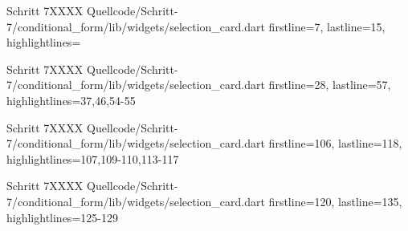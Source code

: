   \begin{alexlisting}{Schritt 7}{XXXX}
    {Quellcode/Schritt-7/conditional_form/lib/widgets/selection_card.dart}
    {firstline=7, lastline=15, highlightlines={}}
    \label{lst:Schritt6XXXX}
\end{alexlisting}
\begin{alexlisting}{Schritt 7}{XXXX}
    {Quellcode/Schritt-7/conditional_form/lib/widgets/selection_card.dart}
    {firstline=28, lastline=57, highlightlines={37,46,54-55}}
    \label{lst:Schritt6XXXX}
\end{alexlisting}
\begin{alexlisting}{Schritt 7}{XXXX}
    {Quellcode/Schritt-7/conditional_form/lib/widgets/selection_card.dart}
    {firstline=106, lastline=118, highlightlines={107,109-110,113-117}}
    \label{lst:Schritt6XXXX}
\end{alexlisting}

\begin{alexlisting}{Schritt 7}{XXXX}
    {Quellcode/Schritt-7/conditional_form/lib/widgets/selection_card.dart}
    {firstline=120, lastline=135, highlightlines={125-129}}
    \label{lst:Schritt6XXXX}
\end{alexlisting} 

\ifincludeall \clearpage \fi 
